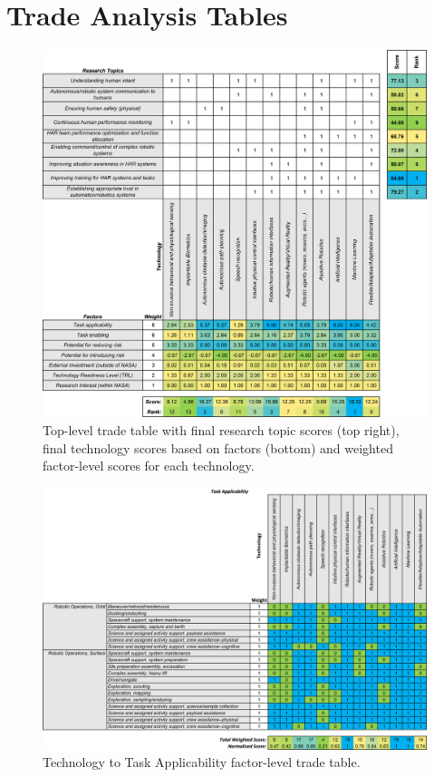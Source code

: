 \chapter{Trade Analysis Tables} \label{appendix:trade-tables}

\begin{figure}[b!]
    \begin{center}
        \includegraphics[width=0.8\linewidth]{figures/TradeStudy/figurea1.png}
        \caption[Top-level trade table]{Top-level trade table with final research topic scores (top right), final technology scores based on factors (bottom) and weighted factor-level scores for each technology.}
    \end{center}
\end{figure}

\begin{figure}[b!]
    \begin{center}
        \includegraphics[width=0.8\linewidth]{figures/TradeStudy/figurea2.png}
        \caption[Technology to Task Applicability factor-level trade table]{Technology to Task Applicability factor-level trade table.}
    \end{center}
\end{figure}

